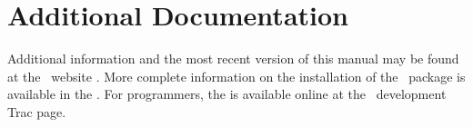 \section{Additional Documentation} \label{sec:additional-docs}
Additional information and the most recent version of this manual may
be found at the \PSI\ website .  
More complete information on the installation of the \PSIfour\ package
is available in the .
For programmers, the  is available online
at the \PSI\ development Trac page.
